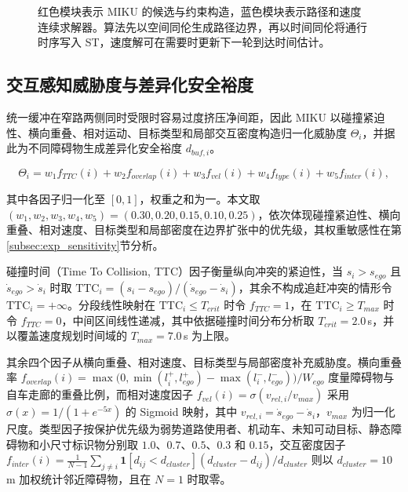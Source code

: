 \documentclass[a4paper,zihao=5]{ctexart}
\theoremstyle{definition}
\begin{document}
\begin{figure}[htbp]
\centering
{}
\caption{MIKU 的约束构造与传递流程}
\caption*{红色模块表示 MIKU 的候选与约束构造，蓝色模块表示路径和速度连续求解器。算法先以空间同伦生成路径边界，再以时间同伦将通行时序写入 ST，速度解可在需要时更新下一轮到达时间估计。}
\label{fig:miku_method_flow}
\end{figure}

\subsection{交互感知威胁度与差异化安全裕度}
\label{sec:method_threat}

统一缓冲在窄路两侧同时受限时容易过度挤压净间距，因此 MIKU 以碰撞紧迫性、横向重叠、相对运动、目标类型和局部交互密度构造归一化威胁度 $\Theta_i$，并据此为不同障碍物生成差异化安全裕度 $d_{buf,i}$。

\begin{equation}
    \Theta_i = w_1 f_{TTC}(i) + w_2 f_{overlap}(i) + w_3 f_{vel}(i) + w_4 f_{type}(i) + w_5 f_{inter}(i),
    \label{eq:threat_score}
\end{equation}

其中各因子归一化至 $[0,1]$，权重之和为一。本文取 $(w_1,w_2,w_3,w_4,w_5)=(0.30,0.20,0.15,0.10,0.25)$，依次体现碰撞紧迫性、横向重叠、相对速度、目标类型和局部密度在边界扩张中的优先级，其权重敏感性在第\ref{subsec:exp_sensitivity}节分析。

碰撞时间（Time To Collision, TTC）因子衡量纵向冲突的紧迫性，当 $s_i>s_{ego}$ 且 $\dot{s}_{ego}>\dot{s}_i$ 时取 $\mathrm{TTC}_i=(s_i-s_{ego})/(\dot{s}_{ego}-\dot{s}_i)$，其余不构成追赶冲突的情形令 $\mathrm{TTC}_i=+\infty$。分段线性映射在 $\mathrm{TTC}_i\leq T_{crit}$ 时令 $f_{TTC}=1$，在 $\mathrm{TTC}_i\geq T_{max}$ 时令 $f_{TTC}=0$，中间区间线性递减，其中依据碰撞时间分布分析\citep{minderhoud2001extended}取 $T_{crit}=2.0$\,s，并以覆盖速度规划时间域的 $T_{max}=7.0$\,s 为上限。

其余四个因子从横向重叠、相对速度、目标类型与局部密度补充威胁度。横向重叠率 $f_{overlap}(i)=\max\!\big(0,\min(l_i^{+},l_{ego}^{+})-\max(l_i^{-},l_{ego}^{-})\big)/W_{ego}$ 度量障碍物与自车走廊的重叠比例，而相对速度因子 $f_{vel}(i)=\sigma(v_{rel,i}/v_{max})$ 采用 $\sigma(x)=1/(1+e^{-5x})$ 的 Sigmoid 映射，其中 $v_{rel,i}=\dot{s}_{ego}-\dot{s}_i$，$v_{max}$ 为归一化尺度。类型因子按保护优先级为弱势道路使用者、机动车、未知可动目标、静态障碍物和小尺寸标识物分别取 $1.0$、$0.7$、$0.5$、$0.3$ 和 $0.15$，交互密度因子 $f_{inter}(i)=\frac{1}{N-1}\sum_{j\neq i}\mathbf{1}[d_{ij}<d_{cluster}](d_{cluster}-d_{ij})/d_{cluster}$ 则以 $d_{cluster}=10$\,m 加权统计邻近障碍物，且在 $N=1$ 时取零。
\end{document}
